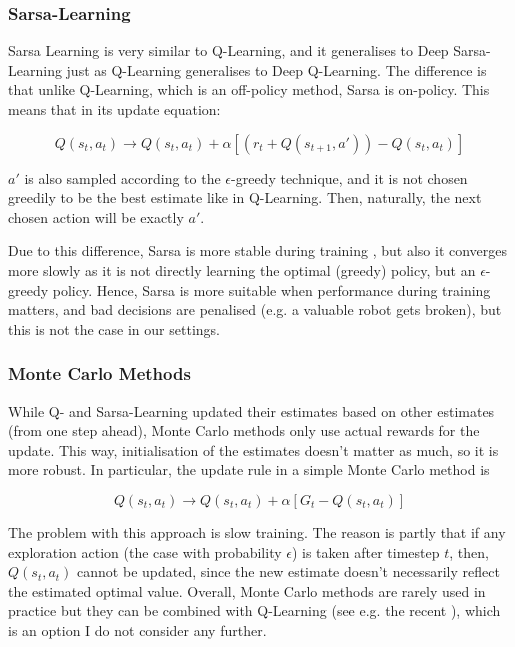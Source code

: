 \subsubsection{Sarsa-Learning}

Sarsa Learning is very similar to Q-Learning, and it generalises to Deep Sarsa-Learning just as Q-Learning generalises to Deep Q-Learning. The difference is that unlike Q-Learning, which is an off-policy method, Sarsa is on-policy. This means that in its update equation:

\begin{equation} \label{eq:sarsa-learningUpdate}
Q(s_t,a_t) \longrightarrow Q(s_t,a_t) + \alpha[( r_t + Q(s_{t+1}, a')) - Q(s_t,a_t)]
\end{equation}

$a'$ is also sampled according to the $\epsilon$-greedy technique, and it is not chosen greedily to be the best estimate like in Q-Learning. Then, naturally, the next chosen action will be exactly $a'$.

Due to this difference, Sarsa is more stable during training , but also it converges more slowly as it is not directly learning the optimal (greedy) policy, but an $\epsilon$-greedy policy. Hence, Sarsa is more suitable when performance during training matters, and bad decisions are penalised (e.g. a valuable robot gets broken), but this is not the case in our settings.

\subsubsection{Monte Carlo Methods}


While Q- and Sarsa-Learning updated their estimates based on other estimates (from one step ahead), Monte Carlo methods only use actual rewards for the update. This way, initialisation of the estimates doesn't matter as much, so it is more robust. In particular, the update rule in a simple Monte Carlo method is

\begin{equation} \label{eq:monte-carloUpdate}
Q(s_t,a_t) \longrightarrow Q(s_t,a_t) + \alpha[G_t - Q(s_t,a_t)]
\end{equation}

The problem with this approach is slow training. The reason is partly that if any exploration action (the case with probability $\epsilon$) is taken after timestep $t$, then, $Q(s_t,a_t)$ cannot be updated, since the new estimate doesn't necessarily reflect the estimated optimal value. Overall, Monte Carlo methods are rarely used in practice but they can be combined with Q-Learning (see e.g. the recent \cite{wang2018montecarloqlearning}), which is an option I do not consider any further.

